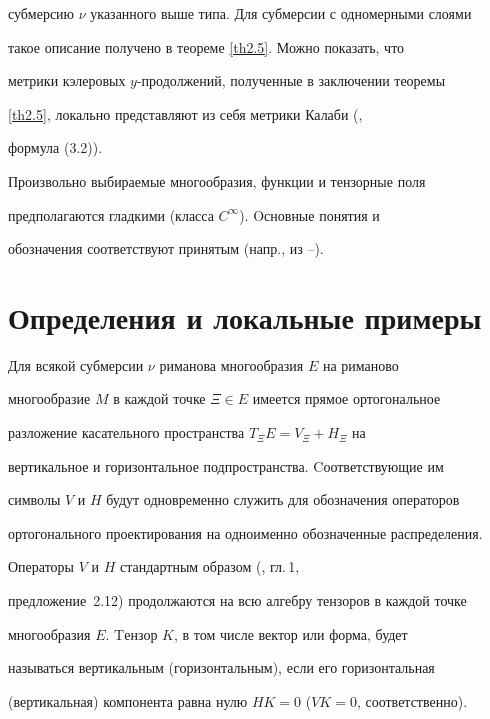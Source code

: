 субмерсию $\nu$ указанного выше типа. Для субмерсии с одномерными слоями


такое описание получено в теореме \ref{th2.5}. Можно показать, что


метрики кэлеровых $y$-продолжений, полученные в заключении теоремы


\ref{th2.5}, локально представляют из себя метрики Калаби (\cite{Cal},


формула (3.2)).





Произвольно выбираемые многообразия, функции и тензорные поля


предполагаются гладкими (класса $C^{\infty}$). Oсновные понятия и


обозначения соответствуют принятым (напр., из \cite{KN1}--\cite{B}).





\section{Определения и локальные примеры}





Для всякой субмерсии $\nu$ риманова многообразия $E$ на риманово


многообразие $M$ в каждой точке $\Xi \in E$ имеется прямое ортогональное


разложение касательного пространства $T_{\Xi }E=V_{\Xi }+H_{\Xi}$ на


вертикальное и горизонтальное подпространства. Cоответствующие им


символы $V$ и $H$ будут одновременно служить для обозначения операторов


ортогонального проектирования на одноименно обозначенные распределения.


Операторы $V$ и $H$ стандартным образом (\cite{KN1}, гл.\,1,


предложение~2.12) продолжаются на всю алгебру тензоров в каждой точке


многообразия $E$. Tензор $K$, в том числе вектор или форма, будет


называться вертикальным (горизонтальным), если его горизонтальная


(вертикальная) компонента равна нулю $HK=0$ ($VK=0$, соответственно).





